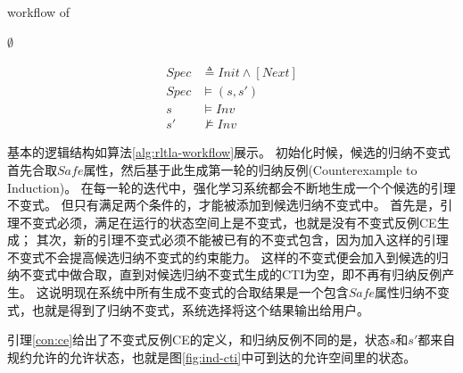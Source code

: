\begin{algorithm}[ht]
    \caption[short]{workflow of \rltla}
    \label{alg:rltla-workflow}
    \BlankLine
    \Ind \leftarrow \Safe \;
    \CTIs \leftarrow \GenIndCTIs{\Module, \Ind} \;
    \CEs \leftarrow $\emptyset$ \;
    \While{\CTIs \neq $\emptyset$}{
        \Inv \leftarrow \GenNextInv{\Module, \Ind, \CTIs, \CEs} \;
        \CEs \leftarrow \GenInvCEs{\Module, \Ind} \;
        \If{\CEs \equal $\emptyset$}{ }{
            \If {\Eliminate{\Module, \Inv, \CTIs}}{
                \Ind \leftarrow \Ind $\wedge$ \Inv \;
                \CTIs $\leftarrow$ \GenIndCTIs{\Module, \Ind} \;
            }
        }
    }
    \Return{\Ind}
\end{algorithm}

\begin{align}
    Spec &\triangleq Init \wedge [Next] \\
	Spec &\vDash (s, s') \label{con:ce} \\ 
	s &\vDash  Inv \\
	s' &\nvDash  Inv 
\end{align}

基本的逻辑结构如算法\ref{alg:rltla-workflow}展示。
初始化时候，候选的归纳不变式首先合取$Safe$属性，然后基于此生成第一轮的归纳反例(Counterexample to Induction)。
在每一轮的迭代中，强化学习系统都会不断地生成一个个候选的引理不变式。
但只有满足两个条件的，才能被添加到候选归纳不变式中。
首先是，引理不变式必须，满足在运行的状态空间上是不变式，也就是没有不变式反例CE生成；
其次，新的引理不变式必须不能被已有的不变式包含，因为加入这样的引理不变式不会提高候选归纳不变式的约束能力。
这样的不变式便会加入到候选的归纳不变式中做合取，直到对候选归纳不变式生成的CTI为空，即不再有归纳反例产生。
这说明现在系统中所有生成不变式的合取结果是一个包含$Safe$属性归纳不变式，也就是得到了归纳不变式，系统选择将这个结果输出给用户。

引理\ref{con:ce}给出了不变式反例CE的定义，和归纳反例不同的是，状态$s$和$s'$都来自规约允许的允许状态，也就是图\ref{fig:ind-cti}中可到达的允许空间里的状态。


